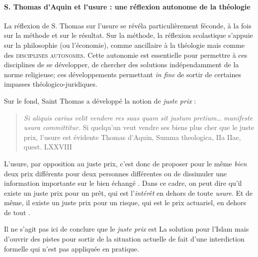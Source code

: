 \paragraph{S. Thomas d'Aquin et l'usure : une réflexion autonome de la théologie}  La réflexion de S. Thomas sur l'usure se révéla particulièrement féconde, à la fois sur la méthode et sur le résultat. Sur la méthode, la réflexion scolastique s'appuie sur la philosophie (ou l'économie), comme ancillaire à la théologie mais comme des \textsc{ disciplines autonomes}. Cette autonomie est essentielle pour permettre à ces disciplines de se développer, de chercher des solutions indépendamment de la norme religieuse; ces développements permettant \textit{in fine} de sortir de certaines impasses théologico-juridiques. 

Sur le fond, Saint Thomas a développé la notion de \textit{juste prix} :
\begin{quote}
    \textit{ Si aliquis carius velit vendere res suas quam sit justum pretium… manifeste usura committitur.} Si quelqu’un veut vendre ses biens plus cher que le juste prix, l’usure est évidente  Thomas d’Aquin, Summa theologica, IIa IIae, quest. LXXVIII
\end{quote}

L'usure, par opposition au juste prix, c'est donc  de proposer pour le même \textit{bien} deux prix différents pour deux personnes différentes ou de dissimuler une information importante sur le bien échangé . Dans ce cadre, on peut dire qu'il existe un juste prix pour un prêt, qui est l'\textit{intérêt} en dehors de toute \emph{usure}. Et de même, il existe  un juste prix pour un risque, qui est le prix actuariel, en dehors de tout \gharar. 

Il ne s'agit pas ici de conclure que le \textit{juste prix} est La solution pour l'Islam mais d'ouvrir des pistes pour sortir de la situation actuelle de fait d'une interdiction formelle qui n'est pas appliquée en pratique.

